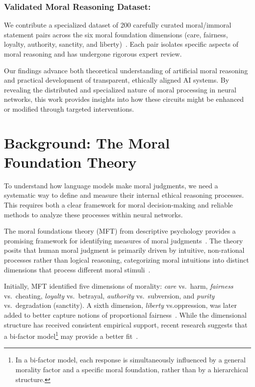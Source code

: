 \documentclass[runninghheads]{llncs}
\begin{document}
\subsubsection{Validated Moral Reasoning Dataset:}
We contribute a specialized dataset of 200 carefully curated moral/immoral statement pairs across the six moral foundation dimensions (care, fairness, loyalty, authority, sanctity, and liberty)~\cite{Haidt2012}. Each pair isolates specific aspects of moral reasoning and has undergone rigorous expert review.

Our findings advance both theoretical understanding of artificial moral reasoning and practical development of transparent, ethically aligned AI systems. By revealing the distributed and specialized nature of moral processing in neural networks, this work provides insights into how these circuits might be enhanced or modified through targeted interventions.



\section{Background: The Moral Foundation Theory}
\label{MFT}
To understand how language models make moral judgments, we need a systematic way to define and measure their internal ethical reasoning processes. This requires both a clear framework for moral decision-making and reliable methods to analyze these processes within neural networks.

The moral foundations theory (MFT) from descriptive psychology provides a promising framework for identifying measures of moral judgments~\cite{Haidt2004}. The theory posits that human moral judgment is primarily driven by intuitive, non-rational processes rather than logical reasoning, categorizing moral intuitions into distinct dimensions that process different moral stimuli~\cite{Simpson2020}.

Initially, MFT identified five dimensions of morality: \emph{care} vs.~harm, \emph{fairness} vs.~cheating, \emph{loyalty} vs.~betrayal, \emph{authority} vs.~subversion, and \emph{purity} vs.~degradation (sanctity)\cite{Graham2011Mapping}. A sixth dimension, \emph{liberty} vs.oppression, was later added to better capture notions of proportional fairness~\cite{Haidt2012}. 
While the dimensional structure has received consistent empirical support, recent research suggests that a bi-factor model\footnote{In a bi-factor model, each response is simultaneously influenced by a general morality factor and a specific moral foundation, rather than by a hierarchical structure.} may provide a better fit~\cite{Wormley2023Measuring}.
\end{document}
